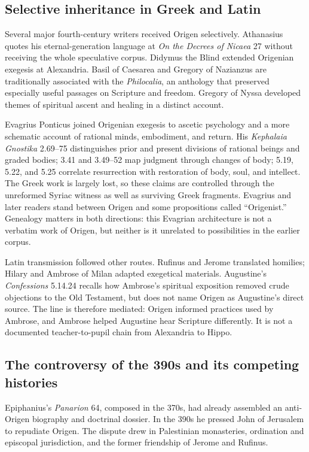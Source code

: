 \subsection{Selective inheritance in Greek and Latin}

Several major fourth-century writers received Origen selectively. Athanasius
quotes his eternal-generation language at \emph{On the Decrees of Nicaea} 27
without receiving the whole speculative corpus. Didymus the Blind extended
Origenian exegesis at Alexandria. Basil of Caesarea and Gregory of Nazianzus
are traditionally associated with the \emph{Philocalia}, an anthology that
preserved especially useful passages on Scripture and freedom. Gregory of
Nyssa developed themes of spiritual ascent and healing in a distinct account.

Evagrius Ponticus joined Origenian exegesis to ascetic psychology and a more
schematic account of rational minds, embodiment, and return. His
\emph{Kephalaia Gnostika} 2.69--75 distinguishes prior and present divisions
of rational beings and graded bodies; 3.41 and 3.49--52 map judgment through
changes of body; 5.19, 5.22, and 5.25 correlate resurrection with restoration
of body, soul, and intellect. The Greek work is largely lost, so these claims
are controlled through the unreformed Syriac witness as well as surviving
Greek fragments. Evagrius and later readers stand between Origen and some
propositions called ``Origenist.'' Genealogy matters in both directions: this
Evagrian architecture is not a verbatim work of Origen, but neither is it
unrelated to possibilities in the earlier corpus.

Latin transmission followed other routes. Rufinus and Jerome translated
homilies; Hilary and Ambrose of Milan adapted exegetical materials. Augustine's
\emph{Confessions} 5.14.24 recalls how Ambrose's spiritual exposition removed
crude objections to the Old Testament, but does not name Origen as Augustine's
direct source. The line is therefore mediated: Origen informed practices used
by Ambrose, and Ambrose helped Augustine hear Scripture differently. It is not
a documented teacher-to-pupil chain from Alexandria to Hippo.

\subsection{The controversy of the 390s and its competing histories}

Epiphanius's \emph{Panarion} 64, composed in the 370s, had already assembled an
anti-Origen biography and doctrinal dossier. In the 390s he pressed John of
Jerusalem to repudiate Origen. The dispute drew in Palestinian monasteries,
ordination and episcopal jurisdiction, and the former friendship of Jerome and
Rufinus.

